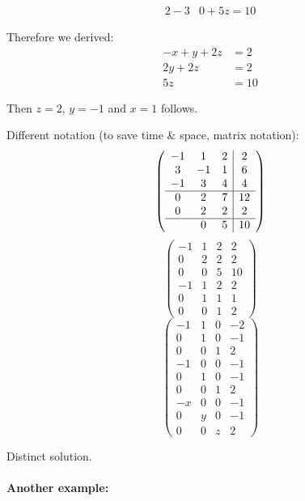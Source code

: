 \documentclass[a4paper,landscape,twocolumn]{article}
\begin{document}
\begin{align*}
  2 - 3 & 0 + 5z = 10
\end{align*}

Therefore we derived:
\begin{align*}
  -x + y + 2z &= 2 \\
  2y + 2z &= 2 \\
  5z &= 10
\end{align*}

Then $z = 2$, $y = -1$ and $x = 1$ follows.

Different notation (to save time \& space, matrix notation):
\[
  \left(\begin{array}{ccc|c}
    -1 &  1 &  2 &  2 \\
     3 & -1 &  1 &  6 \\
    -1 &  3 &  4 &  4 \\
   \hline
     0 &  2 &  7 & 12 \\
     0 &  2 &  2 &  2 \\
   \hline
       &  0 &  5 & 10
  \end{array}\right)
\] \[
  \left(\begin{array}{ccc|c}
    -1 &  1 &  2 & 2 \\
     0 &  2 &  2 & 2 \\
     0 &  0 &  5 & 10 \\
   \hline
    -1 &  1 &  2 & 2 \\
     0 &  1 &  1 & 1 \\
     0 &  0 &  1 & 2
  \end{array}\right)
\] \[
  \left(\begin{array}{ccc|c}
    -1 &  1 &  0 & -2 \\
     0 &  1 &  0 & -1 \\
     0 &  0 &  1 & 2 \\
   \hline
    -1 &  0 &  0 & -1 \\
     0 &  1 &  0 & -1 \\
     0 &  0 &  1 & 2 \\
   \hline
    -x &  0 &  0 & -1 \\
     0 &  y &  0 & -1 \\
     0 &  0 &  z & 2
  \end{array}\right)
\]

Distinct solution.

\paragraph{Another example:}
\end{document}
